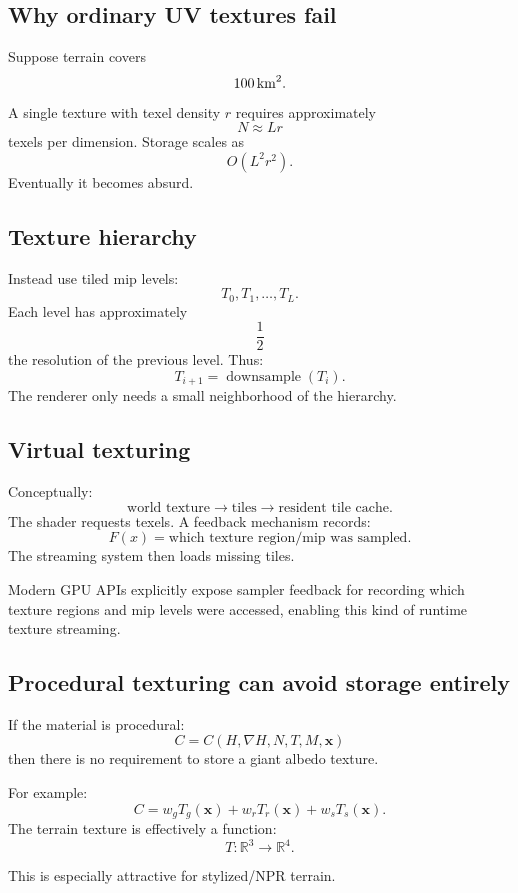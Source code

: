 \documentclass[12pt]{article}
\begin{document}
	\subsection{Why ordinary UV textures fail}
	
	Suppose terrain covers
	\[
	100\,{\rm km}^2.
	\]
	A single texture with texel density $r$ requires approximately
	\[
	N\approx Lr
	\]
	texels per dimension.
	Storage scales as
	\[
	\boxed{
		O(L^2 r^2).
	}
	\]
	Eventually it becomes absurd.
	
	\subsection{Texture hierarchy}
	
	Instead use tiled mip levels:
	\[
	T_0,T_1,\ldots,T_L.
	\]
	Each level has approximately
	\[
	\frac12
	\]
	the resolution of the previous level.
	Thus:
	\[
	T_{i+1}= \operatorname{downsample}(T_i).
	\]
	The renderer only needs a small neighborhood of the hierarchy.
	
	\subsection{Virtual texturing}
	
	Conceptually:
	\[
	\boxed{
		\text{world texture} \rightarrow \text{tiles} \rightarrow \text{resident tile cache}.
	}
	\]
	The shader requests texels.
	A feedback mechanism records:
	\[
	F(x)= \text{which texture region/mip was sampled}.
	\]
	The streaming system then loads missing tiles.
	
	Modern GPU APIs explicitly expose sampler feedback for recording which texture regions and mip levels were accessed, enabling this kind of runtime texture streaming.
	
	\subsection{Procedural texturing can avoid storage entirely}
	
	If the material is procedural:
	\[
	C=C(H,\nabla H,N,T,M,\mathbf x)
	\]
	then there is no requirement to store a giant albedo texture.
	
	For example:
	\[
	C= w_g T_g(\mathbf x) + w_r T_r(\mathbf x) + w_s T_s(\mathbf x).
	\]
	The terrain texture is effectively a function:
	\[
	\boxed{
		T:\mathbb R^3\rightarrow\mathbb R^4.
	}
	\]
	
	This is especially attractive for stylized/NPR terrain.
	
\end{document}
